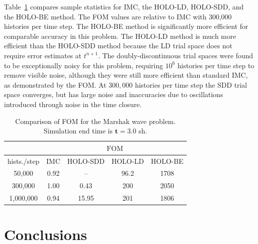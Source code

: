 \documentclass{anstrans}
\newcommand{\FOM}{\ensuremath{\text{FOM}}}
\begin{document}
Table~\ref{tab:marshak_cont} compares sample statistics for IMC,
the HOLO-LD, HOLO-SDD, and the HOLO-BE
method. The FOM values are relative to IMC with 300,000 histories per time
step.  The HOLO-BE method is significantly more efficient for comparable accuracy in this
problem. The HOLO-LD method is much more efficient than the HOLO-SDD method because the LD trial space does not require error estimates at $t^{n+1}$.
The doubly-discontinuous trial spaces were found to be exceptionally noisy for this problem, 
requiring $10^6$ histories per time step to remove visible noise, although they were still more
efficient than standard IMC, as demonstrated by the FOM.  At $300,000$ histories per time step the
SDD trial space converges, but has large noise and inaccuracies due to oscillations introduced
through noise in the time closure.
\begin{table}[H]
\centering
\caption{\label{tab:marshak_cont} {Comparison of FOM for the Marshak
    wave problem.  Simulation end time is $\mathbf{t=3.0}$ sh.}}
\begin{tabular}{|c|cccc|}\cline{2-5}
    \multicolumn{1}{c|}{}        &
    \multicolumn{4}{|c|}{\FOM} \\ \hline
hists./step    &  IMC   & HOLO-SDD  & HOLO-LD  & HOLO-BE    \\ \hline
   50,000      &  0.92  &   --         &  96.2      & 1708             \\
  300,000      &  1.00  &   0.43       &  200     & 2050         \\  
  1,000,000    &  0.94  &  15.95       &  201     & 1806          \\ \hline
\end{tabular}
\end{table}

\section{Conclusions}
\end{document}

